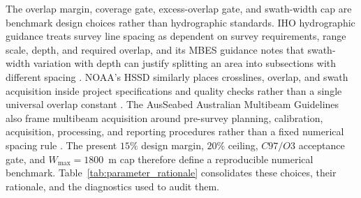 \documentclass[jmse,article,submit,moreauthors]{Definitions/mdpi}
\begin{document}
The overlap margin, coverage gate, excess-overlap gate, and swath-width cap are benchmark design choices rather than hydrographic standards. IHO hydrographic guidance treats survey line spacing as dependent on survey requirements, range scale, depth, and required overlap, and its MBES guidance notes that swath-width variation with depth can justify splitting an area into subsections with different spacing \cite{iho_c13}. NOAA's HSSD similarly places crosslines, overlap, and swath acquisition inside project specifications and quality checks rather than a single universal overlap constant \cite{noaa_hssd2025}. The AusSeabed Australian Multibeam Guidelines also frame multibeam acquisition around pre-survey planning, calibration, acquisition, processing, and reporting procedures rather than a fixed numerical spacing rule \cite{ausseabed2020guidelines}. The present \(15\%\) design margin, \(20\%\) ceiling, \(C97/O3\) acceptance gate, and \(W_{\max}=1800\)~m cap therefore define a reproducible numerical benchmark. Table~\ref{tab:parameter_rationale} consolidates these choices, their rationale, and the diagnostics used to audit them.
\end{document}
